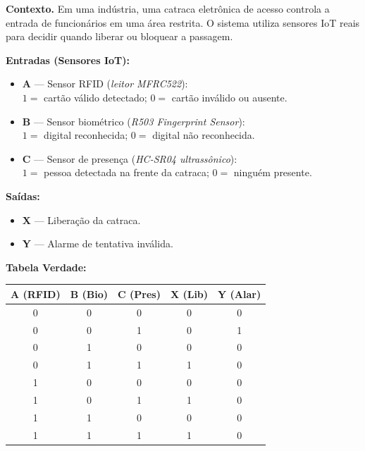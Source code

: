 \documentclass[12pt]{article}
\begin{document}
\textbf{Contexto.}
Em uma indústria, uma catraca eletrônica de acesso controla a entrada de 
funcionários em uma área restrita. O sistema utiliza sensores IoT reais para 
decidir quando liberar ou bloquear a passagem.

\textbf{Entradas (Sensores IoT):}

\begin{itemize}[leftmargin=1.5cm, label=\textbullet]
  \item \textbf{A} — Sensor RFID (\textit{leitor MFRC522}):\\
        $1 = $ cartão válido detectado; $0 = $ cartão inválido ou ausente.
  \item \textbf{B} — Sensor biométrico (\textit{R503 Fingerprint Sensor}):\\
        $1 = $ digital reconhecida; $0 = $ digital não reconhecida.
  \item \textbf{C} — Sensor de presença (\textit{HC-SR04 ultrassônico}):\\
        $1 = $ pessoa detectada na frente da catraca; $0 = $ ninguém presente.
\end{itemize}

\textbf{Saídas:}

\begin{itemize}[leftmargin=1.5cm, label=\textbullet]
  \item \textbf{X} — Liberação da catraca.
  \item \textbf{Y} — Alarme de tentativa inválida.
\end{itemize}

\bigskip

\noindent\textbf{Tabela Verdade:}

\begin{center}
\renewcommand{\arraystretch}{1.2}
\begin{tabular}{|c|c|c||c|c|}
  \hline
  \textbf{A (RFID)} & \textbf{B (Bio)} & \textbf{C (Pres)} & \textbf{X (Lib)} & \textbf{Y (Alar)} \\
  \hline
  0 & 0 & 0 & 0 & 0 \\
  0 & 0 & 1 & 0 & 1 \\
  0 & 1 & 0 & 0 & 0 \\
  0 & 1 & 1 & 1 & 0 \\
  1 & 0 & 0 & 0 & 0 \\
  1 & 0 & 1 & 1 & 0 \\
  1 & 1 & 0 & 0 & 0 \\
  1 & 1 & 1 & 1 & 0 \\
  \hline
\end{tabular}
\end{center}
\end{document}
